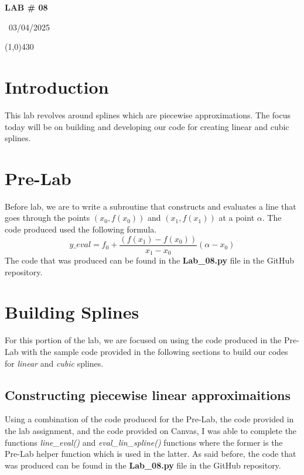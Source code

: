 \documentclass{article}
\begin{document}
\begin{center}
 \LARGE\bfseries LAB \# 08
\end{center}
\begin{center}
    ~03/04/2025~
\end{center}
 \line(1,0){430}

\section{Introduction}
This lab revolves around splines which are piecewise approximations. The focus today will be on building and developing our code for creating linear and cubic splines.

\section{Pre-Lab}
Before lab, we are to write a subroutine that constructs and evaluates a line that goes through the points \((x_0,f(x_0))\) and \((x_1,f(x_1))\) at a point \(\alpha\). The code produced used the following formula.
\[
y\_eval = f_0+\frac{(f(x_1)-f(x_0))}{x_1-x_0}(\alpha-x_0)
\]
The code that was produced can be found in the \textbf{Lab\_08.py} file in the GitHub repository.

\section{Building Splines}
For this portion of the lab, we are focused on using the code produced in the Pre-Lab with the sample code provided in the following sections to build our codes for \textit{linear} and \textit{cubic} splines.

\subsection{Constructing piecewise linear approximaitions}
Using a combination of the code produced for the Pre-Lab, the code provided in the lab assignment, and the code provided on Canvas, I was able to complete the functions \textit{line\_eval()} and \textit{eval\_lin\_spline()} functions where the former is the Pre-Lab helper function which is used in the latter. As said before, the code that was produced can be found in the \textbf{Lab\_08.py} file in the GitHub repository.
\end{document}
